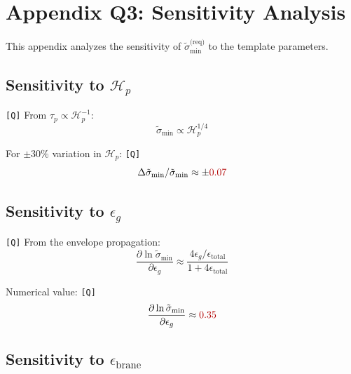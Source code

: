 \documentclass[11pt,a4paper]{article}
\newcommand{\Qval}[1]{\textcolor{red!70!black}{#1}}
\newcommand{\tagQ}{\textcolor{red!70!black}{\texttt{[Q]}}}
\theoremstyle{definition}
\begin{document}
\section{Appendix Q3: Sensitivity Analysis}
\label{app:q3}

\begin{quarantinebox}
This appendix analyzes the sensitivity of $\tilde{\sigma}_{\min}^{\text{(req)}}$
to the template parameters.
\end{quarantinebox}

\subsection{Sensitivity to $\mathcal{H}_p$}
\label{app:sens-hp}

\tagQ{} From $\tau_p \propto \mathcal{H}_p^{-1}$:
\begin{equation}
\label{eq:sens-hp-formula}
\tilde{\sigma}_{\min} \propto \mathcal{H}_p^{1/4}
\end{equation}

For $\pm 30\%$ variation in $\mathcal{H}_p$: \tagQ{}
\begin{equation}
\label{eq:sens-hp-range}
\Delta\tilde{\sigma}_{\min} / \tilde{\sigma}_{\min} \approx \pm \Qval{0.07}
\end{equation}

\subsection{Sensitivity to $\epsilon_g$}
\label{app:sens-eps-g}

\tagQ{} From the envelope propagation:
\begin{equation}
\label{eq:sens-eps-g-formula}
\frac{\partial \ln\tilde{\sigma}_{\min}}{\partial \epsilon_g} \approx \frac{4\epsilon_g/\epsilon_{\text{total}}}{1 + 4\epsilon_{\text{total}}}
\end{equation}

Numerical value: \tagQ{}
\begin{equation}
\label{eq:sens-eps-g-value}
\frac{\partial \ln\tilde{\sigma}_{\min}}{\partial \epsilon_g} \approx \Qval{0.35}
\end{equation}

\subsection{Sensitivity to $\epsilon_{\text{brane}}$}
\label{app:sens-eps-brane}
\end{document}
